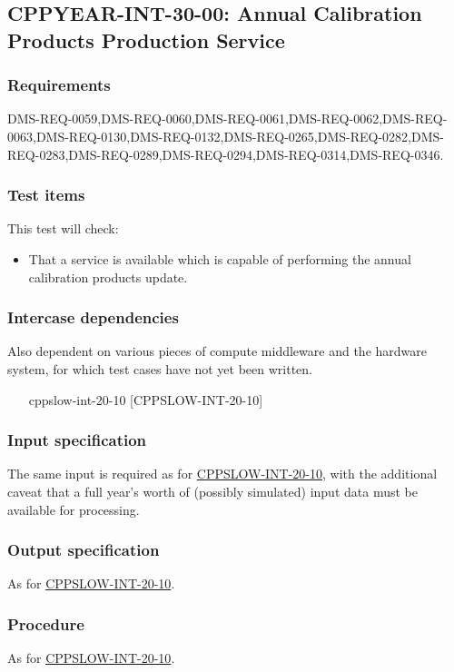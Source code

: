 \subsection{CPPYEAR-INT-30-00: Annual Calibration Products Production Service}
\label{cppyear-int-30-00}

\subsubsection{Requirements}

DMS-REQ-0059,DMS-REQ-0060,DMS-REQ-0061,DMS-REQ-0062,DMS-REQ-0063,DMS-REQ-0130,DMS-REQ-0132,DMS-REQ-0265,DMS-REQ-0282,DMS-REQ-0283,DMS-REQ-0289,DMS-REQ-0294,DMS-REQ-0314,DMS-REQ-0346.

\subsubsection{Test items}

This test will check:

\begin{itemize}

  \item{That a service is available which is capable of performing the annual
  calibration products update.}

\end{itemize}

\subsubsection{Intercase dependencies}

\begin{note}
  Also dependent on various pieces of compute middleware and the hardware
  system, for which test cases have not yet been written.
\end{note}

\begin{itemize}
  \item[cppslow-int-20-10][CPPSLOW-INT-20-10]
\end{itemize}

\subsubsection{Input specification}

The same input is required as for
\hyperref[cppslow-int-20-10]{CPPSLOW-INT-20-10}, with the additional caveat
that a full year's worth of (possibly simulated) input data must be available
for processing.

\subsubsection{Output specification}

As for \hyperref[cppslow-int-20-05]{CPPSLOW-INT-20-10}.

\subsubsection{Procedure}

As for \hyperref[cppslow-int-20-05]{CPPSLOW-INT-20-10}.
